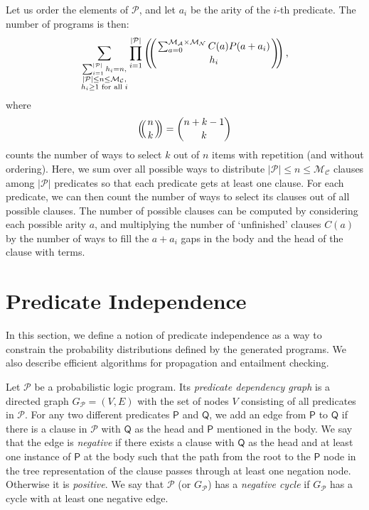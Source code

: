 \documentclass[runningheads]{llncs}
\newcommand{\predicates}{\mathcal{P}}
\newcommand{\maxArity}{\mathcal{M}_{\mathcal{A}}}
\newcommand{\maxNumNodes}{\mathcal{M}_{\mathcal{N}}}
\newcommand{\maxNumClauses}{\mathcal{M}_{\mathcal{C}}}
\def\multiset#1#2{\ensuremath{\left(\kern-.3em\left(\genfrac{}{}{0pt}{}{#1}{#2}\right)\kern-.3em\right)}}
\begin{document}
Let us order the elements of $\predicates{}$, and let $a_i$ be the arity of the
$i$-th predicate. The number of programs is then:
\[
  \sum_{\substack{ \sum_{i=1}^{|\predicates{}|} h_i = n,\\
      |\predicates{}| \le n \le \maxNumClauses,\\
      h_i \ge 1 \text{ for all } i}} \prod_{i=1}^{|\predicates{}|}
  \multiset{\sum_{a=0}^{\maxArity{} \times \maxNumNodes{}} C(a) P(a+a_i)}{h_i},
\]
where
\[
  \multiset{n}{k} = \binom{n+k-1}{k}
\]
counts the number of ways to select $k$ out of $n$ items with repetition (and
without ordering). Here, we sum over all possible ways to distribute
$|\predicates{}| \le n \le \maxNumClauses{}$ clauses among $|\predicates{}|$
predicates so that each predicate gets at least one clause. For each predicate,
we can then count the number of ways to select its clauses out of all possible
clauses. The number of possible clauses can be computed by considering each
possible arity $a$, and multiplying the number of `unfinished' clauses $C(a)$ by
the number of ways to fill the $a+a_i$ gaps in the body and the head of the
clause with terms.

\section{Predicate Independence}

In this section, we define a notion of predicate independence as a way to
constrain the probability distributions defined by the generated programs. We
also describe efficient algorithms for propagation and entailment checking.

\begin{definition}
  Let $\mathscr{P}$ be a probabilistic logic program. Its \emph{predicate
    dependency graph} is a directed graph $G_{\mathscr{P}} = (V, E)$ with the
  set of nodes $V$ consisting of all predicates in $\mathscr{P}$. For any two
  different predicates $\mathsf{P}$ and $\mathsf{Q}$, we add an edge from
  $\mathsf{P}$ to $\mathsf{Q}$ if there is a clause in $\mathscr{P}$ with
  $\mathsf{Q}$ as the head and $\mathsf{P}$ mentioned in the body. We say that
  the edge is \emph{negative} if there exists a clause with $\mathsf{Q}$ as the
  head and at least one instance of $\mathsf{P}$ at the body such that the path
  from the root to the $\mathsf{P}$ node in the tree representation of the
  clause passes through at least one negation node. Otherwise it is
  \emph{positive}. We say that $\mathscr{P}$ (or $G_{\mathscr{P}}$) has a
  \emph{negative cycle} if $G_{\mathscr{P}}$ has a cycle with at least one
  negative edge.
\end{definition}
\end{document}
